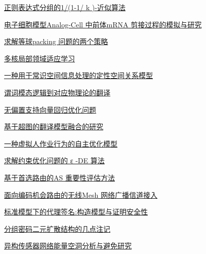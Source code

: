 \documentclass[a4paper]{article}
\begin{document}
\href{http://www.jos.org.cn/ch/reader/download_pdf.aspx?file_no=4098&year_id=2012&quarter_id=9&falg=1}{正则表达式分组的1/(1-1/ k )-近似算法}

\href{http://www.jos.org.cn/ch/reader/download_pdf.aspx?file_no=4121&year_id=2012&quarter_id=9&falg=1}{电子细胞模型Analog-Cell 中前体mRNA 剪接过程的模拟与研究}

\href{http://www.jos.org.cn/ch/reader/download_pdf.aspx?file_no=4158&year_id=2012&quarter_id=9&falg=1}{求解等球packing 问题的两个策略}

\href{http://www.jos.org.cn/ch/reader/download_pdf.aspx?file_no=4240&year_id=2012&quarter_id=9&falg=1}{多核局部领域适应学习}

\href{http://www.jos.org.cn/ch/reader/download_pdf.aspx?file_no=4136&year_id=2012&quarter_id=9&falg=1}{一种用于常识空间信息处理的定性空间关系模型}

\href{http://www.jos.org.cn/ch/reader/download_pdf.aspx?file_no=4163&year_id=2012&quarter_id=9&falg=1}{谓词模态逻辑到对应物理论的翻译}

\href{http://www.jos.org.cn/ch/reader/download_pdf.aspx?file_no=4150&year_id=2012&quarter_id=9&falg=1}{无偏置支持向量回归优化问题}

\href{http://www.jos.org.cn/ch/reader/download_pdf.aspx?file_no=4165&year_id=2012&quarter_id=9&falg=1}{基于超图的翻译模型融合的研究}

\href{http://www.jos.org.cn/ch/reader/download_pdf.aspx?file_no=4174&year_id=2012&quarter_id=9&falg=1}{一种虚拟人作业行为的自主优化模型}

\href{http://www.jos.org.cn/ch/reader/download_pdf.aspx?file_no=4149&year_id=2012&quarter_id=9&falg=1}{求解约束优化问题的 ε -DE 算法}

\href{http://www.jos.org.cn/ch/reader/download_pdf.aspx?file_no=4233&year_id=2012&quarter_id=9&falg=1}{基于首选路由的AS 重要性评估方法}

\href{http://www.jos.org.cn/ch/reader/download_pdf.aspx?file_no=4138&year_id=2012&quarter_id=9&falg=1}{面向编码机会路由的无线Mesh 网络广播信道接入}

\href{http://www.jos.org.cn/ch/reader/download_pdf.aspx?file_no=4246&year_id=2012&quarter_id=9&falg=1}{标准模型下的代理签名:构造模型与证明安全性}

\href{http://www.jos.org.cn/ch/reader/download_pdf.aspx?file_no=4137&year_id=2012&quarter_id=9&falg=1}{分组密码二元扩散结构的几点注记}

\href{http://www.jos.org.cn/ch/reader/download_pdf.aspx?file_no=4167&year_id=2012&quarter_id=9&falg=1}{异构传感器网络能量空洞分析与避免研究}
\end{document}
